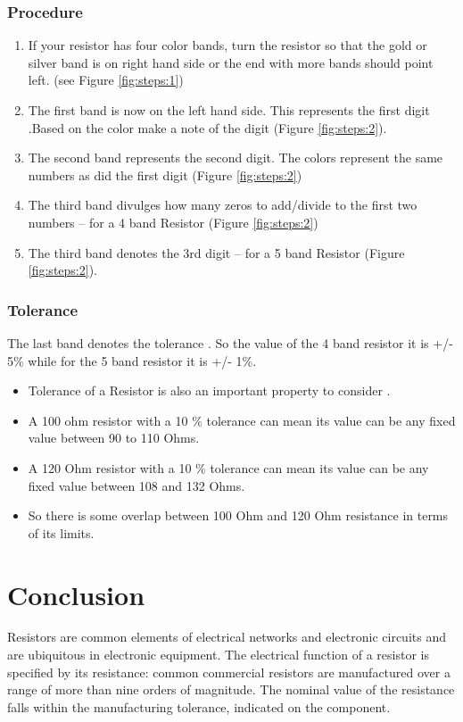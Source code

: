 		\subsubsection{Procedure}
			\begin{enumerate}
				\tightlist
				\item If your resistor has four color bands, turn the resistor so that the gold or silver band is on right hand side or the end with more bands should point left. (see Figure \ref{fig:steps:1})
				\item The first band is now on the left hand side. This represents the first digit .Based on the color make a note of the digit (Figure \ref{fig:steps:2}).
				\item The second band represents the second digit. The colors represent the same numbers as did the first digit (Figure \ref{fig:steps:2})
				\item The third band divulges how many zeros to add/divide to the first two numbers – for a 4 band Resistor (Figure \ref{fig:steps:2})
				\item The third band denotes the 3rd digit – for a 5 band Resistor (Figure \ref{fig:steps:2}).
			\end{enumerate}
			
			\subsubsection{Tolerance}
			The last band denotes the tolerance . So the value of the 4 band resistor it is +/- 5\% while for the 5 band resistor it is +/- 1\%.
			\begin{itemize}
				\item Tolerance of a Resistor is also an important property to consider .
				\item A 100 ohm resistor with a 10 \% tolerance can mean its value can be any fixed value between 90 to 110 Ohms.
				\item A 120 Ohm resistor with a 10 \% tolerance can mean its value can be any fixed value between 108 and 132 Ohms.
				\item So there is some overlap between 100 Ohm and 120 Ohm resistance in terms of its limits.
			\end{itemize}	

\section{Conclusion}
Resistors are common elements of electrical networks and electronic circuits and are ubiquitous in electronic equipment. The electrical function of a resistor is specified by its resistance: common commercial resistors are manufactured over a range of more than nine orders of magnitude. The nominal value of the resistance falls within the manufacturing tolerance, indicated on the component.